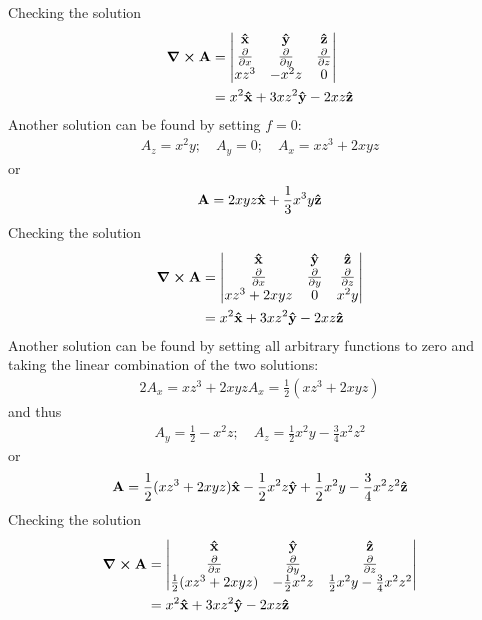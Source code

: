 \documentclass[../main.tex]{subfiles}
\begin{document}
Checking the solution
\begin{align*}
    \curl \vb{A} &= \begin{vmatrix}
        \vu{x} & \vu{y} & \vu{z} \\
        \pdv{x} & \pdv{y} & \pdv{z} \\
        xz^3 & -x^2z & 0
    \end{vmatrix} \\
    &= x^2 \vu{x} + 3xz^2 \vu{y} - 2xz \vu{z} \\
\end{align*}
Another solution can be found by setting $f = 0$:
\begin{align*}
    A_z = x^2y ;\quad A_y = 0 ;\quad A_x = xz^3+2xyz
\end{align*}
or
\begin{align*}
    \vb{A} = 2xyz \vu{x} + \frac{1}{3}x^3y \vu{z}
\end{align*}
Checking the solution
\begin{align*}
    \curl \vb{A} &= \begin{vmatrix}
        \vu{x} & \vu{y} & \vu{z} \\
        \pdv{x} & \pdv{y} & \pdv{z} \\
        xz^3+2xyz & 0 & x^2y
    \end{vmatrix} \\
    &= x^2 \vu{x} + 3xz^2 \vu{y} - 2xz \vu{z}
\end{align*}
Another solution can be found by setting all arbitrary functions to zero and taking the linear
combination of the two solutions:
\begin{align*}
    2A_x = xz^3 + 2xyz
    A_x = \frac{1}{2} (xz^3 + 2xyz)
\end{align*}
and thus
\begin{align*}
    A_y = \frac{1}{2}-x^2z ;\quad A_z = \frac{1}{2} x^2y - \frac{3}{4} x^2z^2
\end{align*}
or
\begin{align*}
    \vb{A} = \frac{1}{2} (xz^3 + 2xyz)                      \vu{x} 
        - \frac{1}{2} x^2z                                  \vu{y}
        + \frac{1}{2} x^2y - \frac{3}{4} x^2z^2             \vu{z}
\end{align*}
Checking the solution
\begin{align*}
    \curl \vb{A} &= \begin{vmatrix}
        \vu{x} & \vu{y} & \vu{z} \\
        \pdv{x} & \pdv{y} & \pdv{z} \\
        \frac{1}{2} (xz^3 + 2xyz) & -\frac{1}{2} x^2z & \frac{1}{2} x^2y - \frac{3}{4} x^2z^2
    \end{vmatrix} \\
    &= x^2 \vu{x} + 3xz^2 \vu{y} - 2xz \vu{z}
\end{align*}
\end{document}
